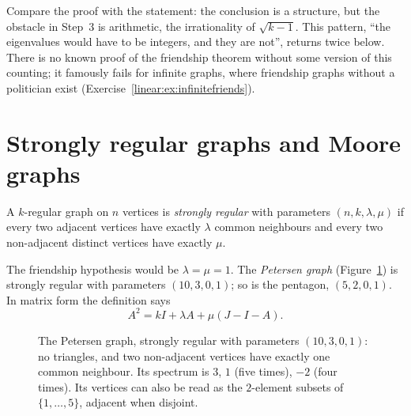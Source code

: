 Compare the proof with the statement: the conclusion is a structure, but the obstacle in Step~3 is arithmetic, the irrationality
of $\sqrt{k-1}$. This pattern, ``the eigenvalues would have to be integers, and they are not'', returns twice below. There is no
known proof of the friendship theorem without some version of this counting; it famously fails for infinite graphs, where
friendship graphs without a politician exist (Exercise~\ref{linear:ex:infinitefriends}).

\section{Strongly regular graphs and Moore graphs}

\begin{definition}\label{linear:def:srg}
A $k$-regular graph on $n$ vertices is \emph{strongly regular} with parameters $(n,k,\lambda,\mu)$ if every two adjacent
vertices have exactly $\lambda$ common neighbours and every two non-adjacent distinct vertices have exactly $\mu$.
\end{definition}

The friendship hypothesis would be $\lambda=\mu=1$. The \emph{Petersen graph} (Figure~\ref{linear:fig:petersen}) is strongly regular with
parameters $(10,3,0,1)$; so is the pentagon, $(5,2,0,1)$. In matrix form the definition says
\begin{equation}\label{linear:eq:srg}
A^2=kI+\lambda A+\mu(J-I-A).
\end{equation}

\begin{figure}[ht]
\centering
{}
\caption{The Petersen graph, strongly regular with parameters $(10,3,0,1)$: no triangles, and two non-adjacent vertices have
exactly one common neighbour. Its spectrum is $3$, $1$ (five times), $-2$ (four times). Its vertices can also be read as the
$2$-element subsets of $\{1,\dots,5\}$, adjacent when disjoint.}
\label{linear:fig:petersen}
\end{figure}

